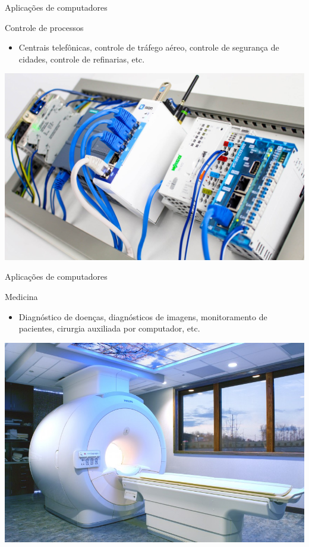 \begin{frame}{Aplicações de computadores}
	\begin{block}{Controle de processos}
		\begin{itemize}
			\item Centrais telefônicas, controle de tráfego aéreo, controle de segurança de cidades, controle de refinarias, etc.
		\end{itemize}
	\end{block}

	\centering
	\includegraphics[width=0.7\linewidth]{Figuras/Ch01/fig16}
\end{frame}


\begin{frame}{Aplicações de computadores}
	\begin{block}{Medicina}
		\begin{itemize}
			\item Diagnóstico de doenças, diagnósticos de imagens, monitoramento de pacientes, cirurgia auxiliada por computador, etc.
		\end{itemize}
	\end{block}

	\centering
	\includegraphics[width=0.7\linewidth]{Figuras/Ch01/fig17}
\end{frame}


